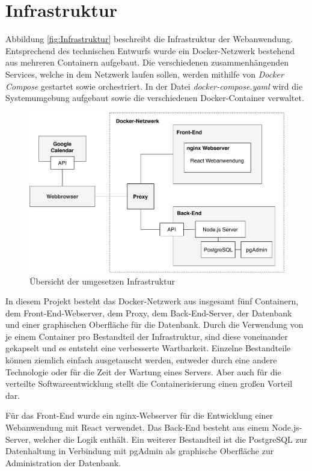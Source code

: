 \section{Infrastruktur}
\label{ch:Infrastruktur}
Abbildung \vref{fig:Infrastruktur} beschreibt die Infrastruktur der Webanwendung. Entsprechend des technischen Entwurfs wurde ein Docker-Netzwerk bestehend aus mehreren Containern aufgebaut.
Die verschiedenen zusammenhängenden Services, welche in dem Netzwerk laufen sollen, werden mithilfe von \textit{Docker Compose} gestartet sowie orchestriert.  
In der Datei \textit{docker-compose.yaml} wird die Systemumgebung aufgebaut sowie die verschiedenen Docker-Container verwaltet.

\begin{figure}[h]
	\centering 
	\includegraphics[width=\textwidth]{img/ImplementierungInfrastruktur.pdf}
	\caption[Übersicht der umgesetzen Infrastruktur]{\label{fig:Infrastruktur}Übersicht der umgesetzen Infrastruktur}
\end{figure}

In diesem Projekt besteht das Docker-Netzwerk aus insgesamt fünf Containern, dem Front-End-Webserver, dem Proxy, dem Back-End-Server, der Datenbank und einer graphischen Oberfläche für die Datenbank.
Durch die Verwendung von je einem Container pro Bestandteil der Infrastruktur, sind diese voneinander gekapselt und es entsteht eine verbesserte Wartbarkeit.
Einzelne Bestandteile können ziemlich einfach ausgetauscht werden, entweder durch eine andere Technologie oder für die Zeit der Wartung eines Servers.
Aber auch für die verteilte Softwareentwicklung stellt die Containerisierung einen großen Vorteil dar. 

Für das Front-End wurde ein nginx-Webserver für die Entwicklung einer Webanwendung mit React verwendet.
Das Back-End besteht aus einem Node.js-Server, welcher die Logik enthält.
Ein weiterer Bestandteil ist die PostgreSQL zur Datenhaltung in Verbindung mit pgAdmin als graphische Oberfläche zur Administration der Datenbank. 


